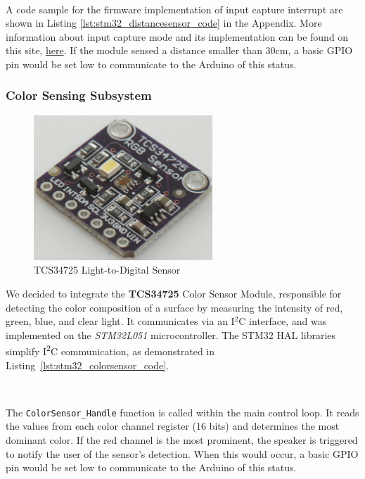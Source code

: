 \documentclass{article}
\begin{document}
\

A code sample for the firmware implementation of input capture interrupt are shown in Listing \ref{lst:stm32_distancesensor_code} in the Appendix. More information about input capture mode and its implementation can be found on this site, \href{https://community.st.com/t5/stm32-mcus/how-to-use-the-input-capture-feature/ta-p/704161}{here}. If the module sensed a distance smaller than 30cm, a basic GPIO pin would be set low to communicate to the Arduino of this status.

\subsubsection{Color Sensing Subsystem}
\label{sec:colorsensor}
\begin{figure}[H]
    \centering
    \includegraphics[width=0.6\textwidth]{Figures/colorsensor.jpg} %
    \caption{TCS34725 Light-to-Digital Sensor}
    \label{fig:colorsensor}


\end{figure}

We decided to integrate the \textbf{TCS34725} Color Sensor Module, responsible for detecting the color composition of a surface by measuring the intensity of red, green, blue, and clear light. It communicates via an I$^2$C interface, and was implemented on the \emph{STM32L051} microcontroller. The STM32 HAL libraries simplify I\textsuperscript{2}C communication, as demonstrated in Listing~\ref{lst:stm32_colorsensor_code}.

\

The \texttt{ColorSensor\_Handle} function is called within the main control loop. It reads the values from each color channel register (16 bits) and determines the most dominant color. If the red channel is the most prominent, the speaker is triggered to notify the user of the sensor's detection. When this would occur, a basic GPIO pin would be set low to communicate to the Arduino of this status.
\end{document}
